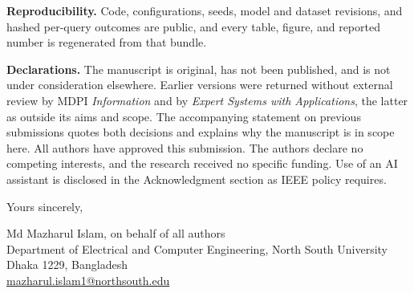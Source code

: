 \documentclass[12pt]{article}
\begin{document}
\textbf{Reproducibility.}
Code, configurations, seeds, model and dataset revisions, and hashed per-query outcomes are
public, and every table, figure, and reported number is regenerated from that bundle.

\textbf{Declarations.}
The manuscript is original, has not been published, and is not under consideration elsewhere.
Earlier versions were returned without external review by MDPI \emph{Information} and by
\emph{Expert Systems with Applications}, the latter as outside its aims and scope. The
accompanying statement on previous submissions quotes both decisions and explains why the
manuscript is in scope here. All authors have approved this submission. The
authors declare no competing interests, and the research received no specific funding. Use of
an AI assistant is disclosed in the Acknowledgment section as IEEE policy requires.

\bigskip

\noindent Yours sincerely,

\medskip

\noindent Md Mazharul Islam, on behalf of all authors\\
Department of Electrical and Computer Engineering, North South University\\
Dhaka 1229, Bangladesh\\
\href{mailto:mazharul.islam1@northsouth.edu}{mazharul.islam1@northsouth.edu}
\end{document}
